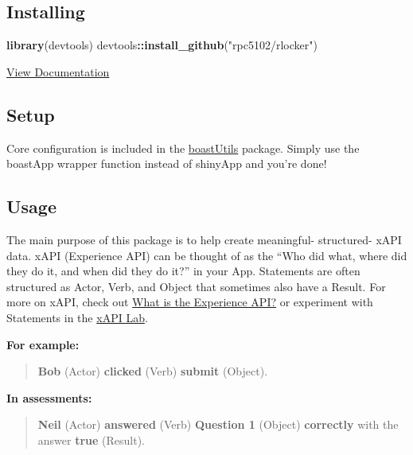\documentclass[
]{book}
\newenvironment{Shaded}{\begin{snugshade}}{\end{snugshade}}
\newcommand{\KeywordTok}[1]{\textcolor[rgb]{0.13,0.29,0.53}{\textbf{#1}}}
\newcommand{\NormalTok}[1]{#1}
\newcommand{\OperatorTok}[1]{\textcolor[rgb]{0.81,0.36,0.00}{\textbf{#1}}}
\newcommand{\StringTok}[1]{\textcolor[rgb]{0.31,0.60,0.02}{#1}}
\begin{document}
\hypertarget{installing}{%
\subsection{Installing}\label{installing}}

\begin{Shaded}
\begin{Highlighting}[]
\KeywordTok{library}\NormalTok{(devtools)}
\NormalTok{devtools}\OperatorTok{::}\KeywordTok{install_github}\NormalTok{(}\StringTok{"rpc5102/rlocker"}\NormalTok{)}
\end{Highlighting}
\end{Shaded}

\href{https://github.com/rpc5102/rlocker\#Installation}{View Documentation}

\hypertarget{setup}{%
\subsection{Setup}\label{setup}}

Core configuration is included in the \href{https://github.com/EducationShinyAppTeam/boastUtils}{boastUtils} package. Simply use the boastApp wrapper function instead of shinyApp and you're done!

\hypertarget{usage}{%
\subsection{Usage}\label{usage}}

The main purpose of this package is to help create meaningful- structured- xAPI data. xAPI (Experience API) can be thought of as the ``Who did what, where did they do it, and when did they do it?'' in your App. Statements are often structured as Actor, Verb, and Object that sometimes also have a Result. For more on xAPI, check out \href{https://xapi.com/overview/}{What is the Experience API?} or experiment with Statements in the \href{https://adlnet.github.io/xapi-lab/}{xAPI Lab}.

\textbf{For example:}

\begin{quote}
\textbf{Bob} (Actor) \textbf{clicked} (Verb) \textbf{submit} (Object).
\end{quote}

\textbf{In assessments:}

\begin{quote}
\textbf{Neil} (Actor) \textbf{answered} (Verb) \textbf{Question 1} (Object) \textbf{correctly} with the answer \textbf{true} (Result).
\end{quote}
\end{document}
